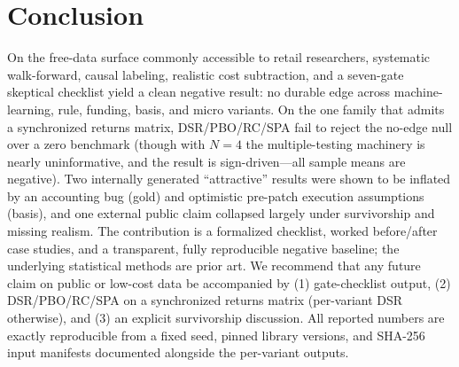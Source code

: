 \documentclass[sigconf,anonymous]{acmart}
\begin{document}
\section{Conclusion}
On the free-data surface commonly accessible to retail researchers, systematic walk-forward, causal labeling, realistic cost subtraction, and a seven-gate skeptical checklist yield a clean negative result: no durable edge across machine-learning, rule, funding, basis, and micro variants. On the one family that admits a synchronized returns matrix, DSR/PBO/RC/SPA fail to reject the no-edge null over a zero benchmark (though with $N{=}4$ the multiple-testing machinery is nearly uninformative, and the result is sign-driven—all sample means are negative). Two internally generated ``attractive'' results were shown to be inflated by an accounting bug (gold) and optimistic pre-patch execution assumptions (basis), and one external public claim collapsed largely under survivorship and missing realism. The contribution is a formalized checklist, worked before/after case studies, and a transparent, fully reproducible negative baseline; the underlying statistical methods are prior art. We recommend that any future claim on public or low-cost data be accompanied by (1) gate-checklist output, (2) DSR/PBO/RC/SPA on a synchronized returns matrix (per-variant DSR otherwise), and (3) an explicit survivorship discussion. All reported numbers are exactly reproducible from a fixed seed, pinned library versions, and SHA-256 input manifests documented alongside the per-variant outputs.
\end{document}
